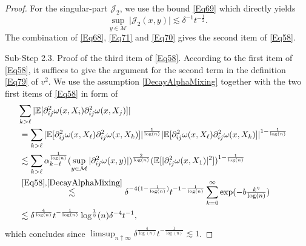 \documentclass[11pt,a4paper,oneside]{amsart}
\numberwithin{equation}{section}
\newcommand{\dd}{\mathrm{d}}
\begin{document}
\begin{proof}
For the singular-part $\mathcal{J}_2$, we use the bound \eqref{Eq69} which directly yields
%
\begin{equation}\label{Eq70}
\sup_{y\in\mathcal{M}}\vert\mathcal{J}_2(x,y)\vert\lesssim \delta^{-1}t^{-\frac{1}{2}}.
\end{equation}
%
The combination of \eqref{Eq68}, \eqref{Eq71} and \eqref{Eq70} gives the second item of \eqref{Eq58}.

%
\medskip
%

{\sc Sub-Step 2.3. Proof of the third item of \eqref{Eq58}. }According to the first item of \eqref{Eq58}, it suffices to give the argument for the second term in the definition \eqref{Eq79} of $v^2$. We use the assumption \eqref{DecayAlphaMixing} together with the two first items of \eqref{Eq58} in form of
%
\begin{align*}
%
\lefteqn{\sum_{k>\ell}\vert\mathbb{E}[\partial^2_{ij}\omega(x,X_i)\partial^2_{ij}\omega(x,X_j)]\vert}\\ &=\sum_{k>\ell}\vert\mathbb{E}[\partial^2_{ij}\omega(x,X_\ell)\partial^2_{ij}\omega(x,X_k)]\vert^{\frac{1}{\log(n)}}\vert\mathbb{E}[\partial^2_{ij}\omega(x,X_\ell)\partial^2_{ij}\omega(x,X_k)]\vert^{1-\frac{1}{\log(n)}}\\
&\lesssim \sum_{k>\ell}\alpha^{\frac{1}{\log(n)}}_{k-\ell}(\sup_{y\in\mathcal{M}}\vert \partial^2_{ij}\omega(x,y)\vert)^{\frac{2}{\log(n)}}(\mathbb{E}[\vert\partial^2_{ij}\omega(x,X_1)\vert^2])^{1-\frac{1}{\log(n)}}\\
&\stackrel{\eqref{Eq58},\eqref{DecayAlphaMixing}}{\lesssim} \delta^{-4(1-\frac{1}{\log(n)})} t^{-1-\frac{1}{\log(n)}}\sum_{k=0}^{\infty}\exp(-b\tfrac{k^{\eta}}{\log(n)})\\
&\lesssim \delta^{\frac{4}{\log(n)}}t^{-\frac{1}{\log(n)}}\log^{\frac{1}{\eta}}(n)\delta^{-4}t^{-1},
%
\end{align*}
%
which concludes since $\limsup_{n\uparrow\infty}\delta^{\frac{4}{\log(n)}}t^{-\frac{1}{\log(n)}}\lesssim 1$. 
%
%


\end{proof}
\end{document}
